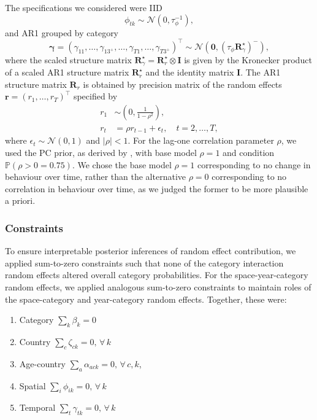\documentclass[a4paper, nobind]{templates/ociamthesis}
\providecommand{\tightlist}{%
  \setlength{\itemsep}{0pt}\setlength{\parskip}{0pt}}
\begin{document}
The specifications we considered were IID
\[
\phi_{tk} \sim \mathcal{N}(0, \tau_\phi^{-1}),
\]
and AR1 grouped by category
\[
\bm{\gamma} = (\gamma_{11}, \ldots, \gamma_{13^{+}}, \ldots, \gamma_{T1}, \ldots, \gamma_{T3^{+}})^\top \sim \mathcal{N}(\mathbf{0}, (\tau_\phi \mathbf{R}^\star_\gamma)^{-}),
\]
where the scaled structure matrix \(\mathbf{R}^\star_\gamma = \mathbf{R}^\star_r \otimes \mathbf{I}\) is given by the Kronecker product of a scaled AR1 structure matrix \(\mathbf{R}^\star_r\) and the identity matrix \(\mathbf{I}\).
The AR1 structure matrix \(\mathbf{R}_r\) is obtained by precision matrix of the random effects \(\mathbf{r} = (r_1, \ldots, r_T)^\top\) specified by
\begin{align}
r_1 &\sim \left( 0, \frac{1}{1 - \rho^2} \right), \\
r_t &= \rho r_{t - 1} + \epsilon_t, \quad t = 2, \ldots, T, 
\end{align}
where \(\epsilon_t \sim \mathcal{N}(0, 1)\) and \(|\rho| < 1\).
For the lag-one correlation parameter \(\rho\), we used the PC prior, as derived by \textcite{sorbye2017penalised}, with base model \(\rho = 1\) and condition \(\mathbb{P}(\rho > 0 = 0.75)\).
We chose the base model \(\rho = 1\) corresponding to no change in behaviour over time, rather than the alternative \(\rho = 0\) corresponding to no correlation in behaviour over time, as we judged the former to be more plausible a priori.

\hypertarget{constraints}{%
\subsubsection{Constraints}\label{constraints}}

To ensure interpretable posterior inferences of random effect contribution, we applied sum-to-zero constraints such that none of the category interaction random effects altered overall category probabilities.
For the space-year-category random effects, we applied analogous sum-to-zero constraints to maintain roles of the space-category and year-category random effects.
Together, these were:

\begin{enumerate}
\def\labelenumi{\arabic{enumi}.}
\tightlist
\item
  Category \(\sum_k \beta_k = 0\)
\item
  Country \(\sum_c \zeta_{ck} = 0, \, \forall \, k\)
\item
  Age-country \(\sum_a \alpha_{ack} = 0, \, \forall \, c, k\),
\item
  Spatial \(\sum_i \phi_{ik} = 0, \, \forall \, k\)
\item
  Temporal \(\sum_t \gamma_{tk} = 0, \, \forall \, k\)
\end{enumerate}
\end{document}
